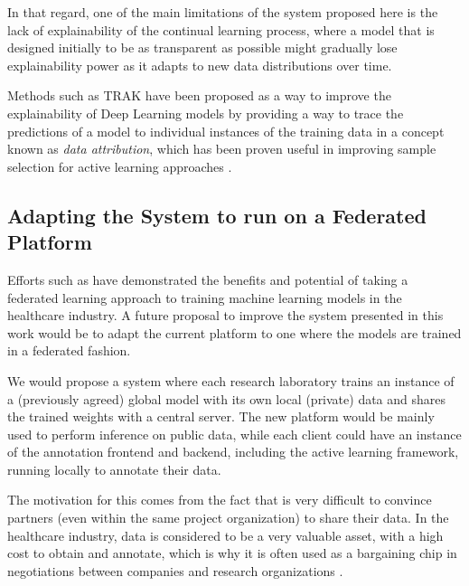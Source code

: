 \documentclass[../main.tex]{subfiles}
\begin{document}
    In that regard, one of the main limitations of the system proposed here is the lack of explainability of the continual learning process, where a model that is designed initially to be as transparent as possible might gradually lose explainability power as it adapts to new data distributions over time.
    
    
    
    Methods such as TRAK \cite{park_trak_2023} have been proposed as a way to improve the explainability of Deep Learning models by providing a way to trace the predictions of a model to individual instances of the training data in a concept known as \textit{data attribution}, which has been proven useful in improving sample selection for active learning approaches \cite{park_trak_2023, holzmuller_framework_2023, liu_influence_2021}.

    \subsection{Adapting the System to run on a Federated Platform} \label{conclusions:future_work:federated} 

    Efforts such as \cite{joshi_federated_2022} have demonstrated the benefits and potential of taking a federated learning approach to training machine learning models in the healthcare industry. A future proposal to improve the system presented in this work would be to adapt the current platform to one where the models are trained in a federated fashion.
    
    We would propose a system where each research laboratory trains an instance of a (previously agreed) global model with its own local (private) data and shares the trained weights with a central server. The new platform would be mainly used to perform inference on public data, while each client could have an instance of the annotation frontend and backend, including the active learning framework, running locally to annotate their data. 
    
    The motivation for this comes from the fact that is very difficult to convince partners (even within the same project organization) to share their data. In the healthcare industry, data is considered to be a very valuable asset, with a high cost to obtain and annotate, which is why it is often used as a bargaining chip in negotiations between companies and research organizations .

\end{document}
